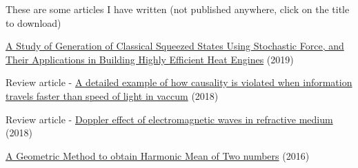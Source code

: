 

\begin{cventries}

  \cventry
    {These are some articles I have written (not published anywhere, click on the title to download)} %
    {} %
    {} %
    {} %
    {
      \begin{cvitems} %
      	\item{\href{https://github.com/apandada1/apandada1.github.io/raw/master/articles/nanoheatengines.pdf}{A Study of Generation of Classical Squeezed States Using Stochastic Force, and Their Applications in Building Highly Efficient Heat Engines} (2019)}
        \item {Review article - \href{http://archisman.tk/articles/tachyon.pdf}{A detailed example of how causality is violated when information travels faster than speed of light in vaccum} (2018)}
        \item{Review article - \href{http://archisman.tk/articles/doppler_effect.pdf}{Doppler effect of electromagnetic waves in refractive medium} (2018)}
        \item{\href{http://archisman.tk/articles/Harmonic_Mean.pdf}{A Geometric Method to obtain Harmonic Mean of Two numbers} (2016)}
      \end{cvitems}
    }
\end{cventries}
